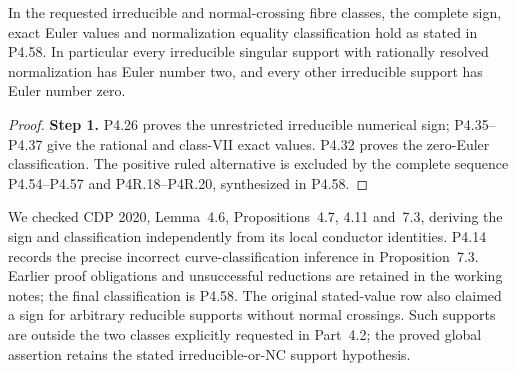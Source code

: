 \begin{proposition}[P4.9]\label{night:P4.9}\label{stmt:P4.9}

In the requested irreducible and normal-crossing fibre classes,
the complete sign, exact Euler values and normalization equality
classification hold as stated in P4.58. In particular every
irreducible singular support with rationally resolved normalization
has Euler number two, and every other irreducible support has
Euler number zero.
\end{proposition}
\begin{proof}
\noindent\textbf{Step 1.} P4.26 proves the unrestricted irreducible numerical sign;
P4.35--P4.37 give the rational and class-VII exact values.
P4.32 proves the zero-Euler classification. The positive ruled
alternative is excluded by the complete sequence P4.54--P4.57
and P4R.18--P4R.20, synthesized in P4.58.
\end{proof}
We checked CDP 2020, Lemma~4.6, Propositions~4.7,
4.11 and~7.3, deriving the sign and classification independently
from its local conductor identities. P4.14 records the precise
incorrect curve-classification inference in Proposition~7.3.
Earlier proof obligations and unsuccessful reductions are retained
in the working notes; the final classification is P4.58.
The original stated-value row also claimed a sign for arbitrary
reducible supports without normal crossings. Such supports are
outside the two classes explicitly requested in Part~4.2; the
proved global assertion retains the stated irreducible-or-NC
support hypothesis.

